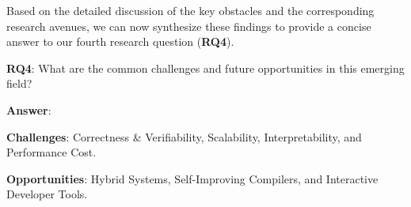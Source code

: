 \documentclass[pdflatex,sn-mathphys-ay,twocolumn, a4paper]{sn-jnl}%
\theoremstyle{thmstyleone}%
\theoremstyle{thmstyletwo}%
\theoremstyle{thmstylethree}%
\begin{document}
Based on the detailed discussion of the key obstacles and the corresponding research avenues, we can now synthesize these findings to provide a concise answer to our fourth research question (\textbf{RQ4}).

\begin{tcolorbox}[colback=white,colframe=black]
    \textbf{RQ4}: What are the common challenges and future opportunities in this emerging field?

    \textbf{Answer}:

    \textbf{Challenges}: Correctness \& Verifiability, Scalability, Interpretability, and Performance Cost.
    
    \textbf{Opportunities}: Hybrid Systems, Self-Improving Compilers, and Interactive Developer Tools.
\end{tcolorbox}
\end{document}

